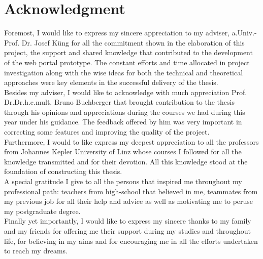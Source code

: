 \chapter*{Acknowledgment}
\indent Foremost, I would like to express my sincere appreciation to my adviser, a.Univ.-Prof. Dr. Josef Küng for all the commitment shown in the elaboration of this project, the support and shared knowledge that contributed to the development of the web portal prototype. The constant efforts and time allocated in project investigation along with the wise ideas for both the technical and theoretical approaches were key elements in the successful delivery of the thesis.\\
\indent Besides my adviser, I would like to acknowledge with much appreciation Prof. Dr.Dr.h.c.mult. Bruno Buchberger that brought contribution to the thesis through his opinions and appreciations during the courses we had during this year under his guidance. The feedback offered by him was very important in correcting some features and improving the quality of the project.\\
\indent Furthermore, I would to like express my deepest appreciation to all the professors from Johannes Kepler University of Linz whose courses I followed for all the knowledge transmitted and for their devotion. All this knowledge stood at the foundation of constructing this thesis.\\
\indent A special gratitude I give to all the persons that inspired me throughout my professional path: teachers from high-school that believed in me, teammates from my previous job for all their help and advice as well as motivating me to peruse my postgraduate degree. \\
\indent Finally yet importantly, I would like to express my sincere thanks to my family and my friends for offering me their support during my studies and throughout life, for believing in my aims and for encouraging me in all the efforts undertaken to reach my dreams.